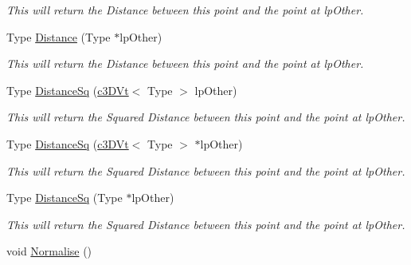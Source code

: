 \begin{DoxyCompactItemize}
\begin{DoxyCompactList}\small\item\em This will return the Distance between this point and the point at lpOther. \end{DoxyCompactList}\item 
\hypertarget{classc3_d_vt_ac7439ffd19b1df2dc18303a483b342ff}{
Type \hyperlink{classc3_d_vt_ac7439ffd19b1df2dc18303a483b342ff}{Distance} (Type $\ast$lpOther)}
\label{classc3_d_vt_ac7439ffd19b1df2dc18303a483b342ff}

\begin{DoxyCompactList}\small\item\em This will return the Distance between this point and the point at lpOther. \end{DoxyCompactList}\item 
\hypertarget{classc3_d_vt_a1901cd6293390725bf7950e0a6d5b2f6}{
Type \hyperlink{classc3_d_vt_a1901cd6293390725bf7950e0a6d5b2f6}{DistanceSq} (\hyperlink{classc3_d_vt}{c3DVt}$<$ Type $>$ lpOther)}
\label{classc3_d_vt_a1901cd6293390725bf7950e0a6d5b2f6}

\begin{DoxyCompactList}\small\item\em This will return the Squared Distance between this point and the point at lpOther. \end{DoxyCompactList}\item 
\hypertarget{classc3_d_vt_a624d1be398d063fb21fcc6ec8acbe58b}{
Type \hyperlink{classc3_d_vt_a624d1be398d063fb21fcc6ec8acbe58b}{DistanceSq} (\hyperlink{classc3_d_vt}{c3DVt}$<$ Type $>$ $\ast$lpOther)}
\label{classc3_d_vt_a624d1be398d063fb21fcc6ec8acbe58b}

\begin{DoxyCompactList}\small\item\em This will return the Squared Distance between this point and the point at lpOther. \end{DoxyCompactList}\item 
\hypertarget{classc3_d_vt_ae6b81b3d9b691fe26826d14f4e508fa8}{
Type \hyperlink{classc3_d_vt_ae6b81b3d9b691fe26826d14f4e508fa8}{DistanceSq} (Type $\ast$lpOther)}
\label{classc3_d_vt_ae6b81b3d9b691fe26826d14f4e508fa8}

\begin{DoxyCompactList}\small\item\em This will return the Squared Distance between this point and the point at lpOther. \end{DoxyCompactList}\item 
\hypertarget{classc3_d_vt_ab0596e7c234a2737701a3be5ed985205}{
void \hyperlink{classc3_d_vt_ab0596e7c234a2737701a3be5ed985205}{Normalise} ()}
\label{classc3_d_vt_ab0596e7c234a2737701a3be5ed985205}


\end{DoxyCompactItemize}
